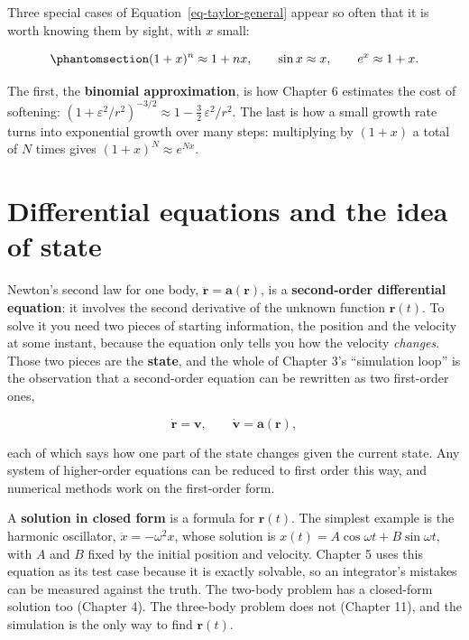 \documentclass[
  10.5pt,
  letterpaper,
]{scrbook}
\theoremstyle{plain}
\theoremstyle{remark}
\begin{document}
Three special cases of Equation~\ref{eq-taylor-general} appear so often
that it is worth knowing them by sight, with \(x\) small:

\begin{equation}\protect\phantomsection\label{eq-common-approximations}{
(1 + x)^n \approx 1 + nx, \qquad \sin x \approx x, \qquad e^x \approx 1 + x.
}\end{equation}

The first, the \textbf{binomial approximation}, is how Chapter 6
estimates the cost of softening:
\((1 + \varepsilon^2/r^2)^{-3/2} \approx 1 - \tfrac32\,\varepsilon^2/r^2\).
The last is how a small growth rate turns into exponential growth over
many steps: multiplying by \((1 + x)\) a total of \(N\) times gives
\((1+x)^N \approx e^{Nx}\).

\section{Differential equations and the idea of
state}\label{differential-equations-and-the-idea-of-state}

Newton's second law for one body,
\(\ddot{\mathbf{r}} = \mathbf{a}(\mathbf{r})\), is a
\textbf{second-order differential equation}: it involves the second
derivative of the unknown function \(\mathbf{r}(t)\). To solve it you
need two pieces of starting information, the position and the velocity
at some instant, because the equation only tells you how the velocity
\emph{changes}. Those two pieces are the \textbf{state}, and the whole
of Chapter 3's ``simulation loop'' is the observation that a
second-order equation can be rewritten as two first-order ones,

\[
\dot{\mathbf{r}} = \mathbf{v}, \qquad \dot{\mathbf{v}} = \mathbf{a}(\mathbf{r}),
\]

each of which says how one part of the state changes given the current
state. Any system of higher-order equations can be reduced to first
order this way, and numerical methods work on the first-order form.

A \textbf{solution in closed form} is a formula for \(\mathbf{r}(t)\).
The simplest example is the harmonic oscillator,
\(\ddot x = -\omega^2 x\), whose solution is
\(x(t) = A\cos\omega t + B\sin\omega t\), with \(A\) and \(B\) fixed by
the initial position and velocity. Chapter 5 uses this equation as its
test case because it is exactly solvable, so an integrator's mistakes
can be measured against the truth. The two-body problem has a
closed-form solution too (Chapter 4). The three-body problem does not
(Chapter 11), and the simulation is the only way to find
\(\mathbf{r}(t)\).
\end{document}
